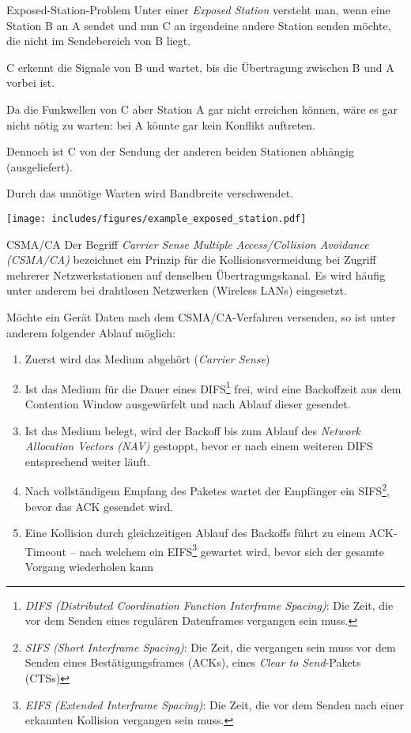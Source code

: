 \begin{defi}{Exposed-Station-Problem}
    Unter einer \emph{Exposed Station} versteht man, wenn eine Station B an A sendet und nun C an irgendeine andere Station senden möchte, die nicht im Sendebereich von B liegt.

    C erkennt die Signale von B und wartet, bis die Übertragung zwischen B und A vorbei ist.

    Da die Funkwellen von C aber Station A gar nicht erreichen können, wäre es gar nicht nötig zu warten: bei A könnte gar kein Konflikt auftreten.

    Dennoch ist C von der Sendung der anderen beiden Stationen abhängig (ausgeliefert).

    Durch das unnötige Warten wird Bandbreite verschwendet.

    \centering
    \texttt{[image: includes/figures/example\_exposed\_station.pdf]}
\end{defi}

\begin{defi}{CSMA/CA}
    Der Begriff \emph{Carrier Sense Multiple Access/Collision Avoidance (CSMA/CA)} bezeichnet ein Prinzip für die Kollisionsvermeidung bei Zugriff mehrerer Netzwerkstationen auf denselben Übertragungskanal. Es wird häufig unter anderem bei drahtlosen Netzwerken (Wireless LANs) eingesetzt.

    Möchte ein Gerät Daten nach dem CSMA/CA-Verfahren versenden, so ist unter anderem folgender Ablauf möglich:
    \begin{enumerate}
        \item Zuerst wird das Medium abgehört (\emph{Carrier Sense})
        \item Ist das Medium für die Dauer eines DIFS\footnote{\emph{DIFS (Distributed Coordination Function Interframe Spacing)}: Die Zeit, die vor dem Senden eines regulären Datenframes vergangen sein muss.} frei, wird eine Backoffzeit aus dem Contention Window ausgewürfelt und nach Ablauf dieser gesendet.
        \item Ist das Medium belegt, wird der Backoff bis zum Ablauf des \emph{Network Allocation Vectors (NAV)} gestoppt, bevor er nach einem weiteren DIFS entsprechend weiter läuft.
        \item Nach vollständigem Empfang des Paketes wartet der Empfänger ein SIFS\footnote{\emph{SIFS (Short Interframe Spacing)}: Die Zeit, die vergangen sein muss vor dem Senden eines Bestätigungsframes (ACKs), eines \emph{Clear to Send}-Pakets (CTSs)}, bevor das ACK gesendet wird.
        \item Eine Kollision durch gleichzeitigen Ablauf des Backoffs führt zu einem ACK-Timeout – nach welchem ein EIFS\footnote{\emph{EIFS (Extended Interframe Spacing)}: Die Zeit, die vor dem Senden nach einer erkannten Kollision vergangen sein muss.} gewartet wird, bevor sich der gesamte Vorgang wiederholen kann
    \end{enumerate}
\end{defi}